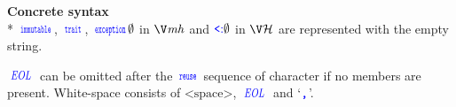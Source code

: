 \parbox{\linewidth}{
\textbf{Concrete syntax}
\small\\*
$\IMdf$,
$\traitKw$,
$\exceptionKw \emptyset$ in $\mh$
and $ \mbox{\color{blue}{\texttt{<}}}  \mbox{\color{blue}{\texttt{$:$}}} \emptyset$ in $\h$ are represented with the empty string.

$\EOL$ can be omitted after the $\reuseKw$ sequence of character if no members are present.
White-space consists of $\mbox{<space>}$, $\EOL$ and `$ \mbox{\color{blue}{\texttt{,}}} $'.
}
 
